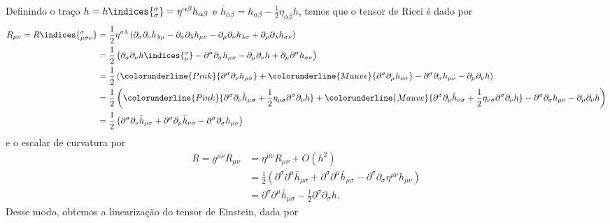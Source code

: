 Definindo o traço \(h = h\indices{^\sigma_\sigma} = \eta^{\alpha\beta}h_{\alpha\beta}\) e \(\bar{h}_{\alpha\beta} = h_{\alpha \beta} - \frac12 \eta_{\alpha \beta}h\), temos que o tensor de Ricci é dado por
\begin{align*}
    R_{\mu\nu} = R\indices{^\sigma_{\mu\sigma\nu}} &= \frac12 \eta^{\sigma \lambda}\left(\partial_\sigma\partial_{\nu}h_{\lambda\mu} - \partial_\sigma\partial_{\lambda}h_{\mu\nu} - \partial_\mu\partial_{\nu}h_{\lambda\sigma} + \partial_\mu\partial_{\lambda}h_{\sigma\nu}\right)\\
                                                   &= \frac12 \left(\partial_\sigma\partial_\nu h\indices{^\sigma_\mu} - \partial^\sigma\partial_\sigma h_{\mu\nu} - \partial_\mu\partial_\nu h + \partial_\mu \partial^\sigma h_{\sigma \nu}\right)\\
                                                   &= \frac12 \left(\colorunderline{Pink}{\partial^\sigma\partial_\nu h_{\mu\sigma}} + \colorunderline{Mauve}{\partial^\sigma \partial_\mu h_{\nu\sigma}} - \partial^\sigma\partial_\sigma h_{\mu\nu} - \partial_\mu\partial_\nu h\right)\\
                                                   &= \frac12 \left(\colorunderline{Pink}{\partial^\sigma\partial_\nu \bar{h}_{\mu\sigma} + \frac12\eta_{\mu \sigma}\partial^\sigma\partial_\nu h} + \colorunderline{Mauve}{\partial^\sigma \partial_\mu \bar{h}_{\nu\sigma}+\frac12 \eta_{\nu\sigma}\partial^\sigma\partial_\nu h} - \partial^\sigma\partial_\sigma h_{\mu\nu} - \partial_\mu\partial_\nu h\right)\\
                                                   &= \frac12 \left(\partial^\sigma\partial_\nu \bar{h}_{\mu\sigma} + \partial^\sigma\partial_\mu \bar{h}_{\nu\sigma} - \partial^\sigma \partial_\sigma h_{\mu\nu}\right)
\end{align*}
e o escalar de curvatura por
\begin{align*}
    R = g^{\mu\nu}R_{\mu\nu} &= \eta^{\mu\nu}R_{\mu\nu} + O(h^2)\\
                             &= \frac12 \left(\partial^\sigma\partial^\mu \bar{h}_{\mu\sigma} + \partial^\sigma\partial^\mu \bar{h}_{\mu\sigma} - \partial^\sigma \partial_\sigma \eta^{\mu\nu}h_{\mu\nu}\right)\\
                             &= \partial^\sigma\partial^\mu \bar{h}_{\mu\sigma} - \frac12 \partial^\sigma \partial_\sigma h.
\end{align*}
Desse modo, obtemos a linearização do tensor de Einstein, dada por
